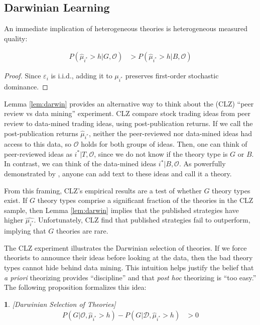 \documentclass[12pt,english]{article}
\theoremstyle{plain}
\theoremstyle{plain}
\newtheorem{prop}[thm]{\protect\propositionname}
\providecommand{\propositionname}{Proposition}
\providecommand{\propositionname}{Proposition}
\begin{document}
 

\subsection{Darwinian Learning}

An immediate implication of heterogeneous theories is heterogeneous measured quality:
\begin{lemma}
    \label{lem:darwin}
    \begin{align}
        P\left(\hat{\mu}_{i^{\ast}}>h|G,\mathcal{O}\right) 
        &>
        P\left(\hat{\mu}_{i^{\ast}}>h|B,\mathcal{O}\right)
    \end{align}
\end{lemma}
\begin{proof}
    Since $\varepsilon_{i}$ is i.i.d., adding it to $\mu_{i^{\ast}}$ preserves first-order stochastic dominance.
\end{proof}

Lemma \ref{lem:darwin} provides an alternative way to think about the \citet{chen2022peer} (CLZ) ``peer review vs data mining'' experiment. CLZ compare stock trading ideas from peer review to data-mined trading ideas, using post-publication returns. If we call the post-publication returns $\hat{\mu}_{i^\ast}$, neither the peer-reviewed nor data-mined ideas had access to this data, so $\mathcal{O}$ holds for both groups of ideas. Then, one can think of peer-reviewed ideas as $i^\ast|T,\mathcal{O}$, since we do not know if the theory type is $G$ or $B$. In contrast, we can think of the data-mined ideas $i^\ast |B,\mathcal{O}$. As powerfully demonstrated by \citet{novy2025ai}, anyone can add text to these ideas and call it a theory. 

From this framing, CLZ's empirical results are a test of whether $G$ theory types exist. If $G$ theory types comprise a significant fraction of the theories in the CLZ sample, then Lemma \ref{lem:darwin} implies that the published strategies have higher $\hat{\mu_{i^\ast}}$. Unfortunately, CLZ find that published strategies fail to outperform, implying that $G$ theories are rare. 


The CLZ experiment illustrates the Darwinian selection of theories. If we force theorists to announce their ideas before looking at the data, then the bad theory types cannot hide  behind data mining.  This intuition helps justify the belief that \emph{a priori} theorizing provides ``discipline'' and that \emph{post hoc} theorizing is ``too easy.''  The following proposition formalizes this idea:
\begin{prop}\label{prop:darwin}
{[}Darwinian Selection of Theories{]} 
\begin{align*}
P\left(G|\mathcal{O},\hat{\mu}_{i^{\ast}}>h\right)-P\left(G|\mathcal{\mathcal{D}},\hat{\mu}_{i^{\ast}}>h\right) & >0
\end{align*}
\end{prop}
\end{document}
